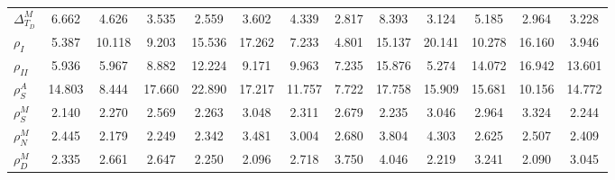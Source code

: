 \begin{center}
\begin{longtable}{lcccccccccccc}
$ {\Delta^{M}_{T_D}}   $	 & 	       6.662	 & 	       4.626	 & 	       3.535	 & 	       2.559	 & 	       3.602	 & 	       4.339	 & 	       2.817	 & 	       8.393	 & 	       3.124	 & 	       5.185	 & 	       2.964	 & 	       3.228 \\ 
$ {\rho_{I}}           $	 & 	       5.387	 & 	      10.118	 & 	       9.203	 & 	      15.536	 & 	      17.262	 & 	       7.233	 & 	       4.801	 & 	      15.137	 & 	      20.141	 & 	      10.278	 & 	      16.160	 & 	       3.946 \\ 
$ {\rho_{II}}          $	 & 	       5.936	 & 	       5.967	 & 	       8.882	 & 	      12.224	 & 	       9.171	 & 	       9.963	 & 	       7.235	 & 	      15.876	 & 	       5.274	 & 	      14.072	 & 	      16.942	 & 	      13.601 \\ 
$ {\rho^{A}_{S}}       $	 & 	      14.803	 & 	       8.444	 & 	      17.660	 & 	      22.890	 & 	      17.217	 & 	      11.757	 & 	       7.722	 & 	      17.758	 & 	      15.909	 & 	      15.681	 & 	      10.156	 & 	      14.772 \\ 
$ {\rho^{M}_{S}}       $	 & 	       2.140	 & 	       2.270	 & 	       2.569	 & 	       2.263	 & 	       3.048	 & 	       2.311	 & 	       2.679	 & 	       2.235	 & 	       3.046	 & 	       2.964	 & 	       3.324	 & 	       2.244 \\ 
$ {\rho^{M}_{N}}       $	 & 	       2.445	 & 	       2.179	 & 	       2.249	 & 	       2.342	 & 	       3.481	 & 	       3.004	 & 	       2.680	 & 	       3.804	 & 	       4.303	 & 	       2.625	 & 	       2.507	 & 	       2.409 \\ 
$ {\rho^{M}_{D}}       $	 & 	       2.335	 & 	       2.661	 & 	       2.647	 & 	       2.250	 & 	       2.096	 & 	       2.718	 & 	       3.750	 & 	       4.046	 & 	       2.219	 & 	       3.241	 & 	       2.090	 & 	       3.045 \\ 
\end{longtable}
 \end{center}
